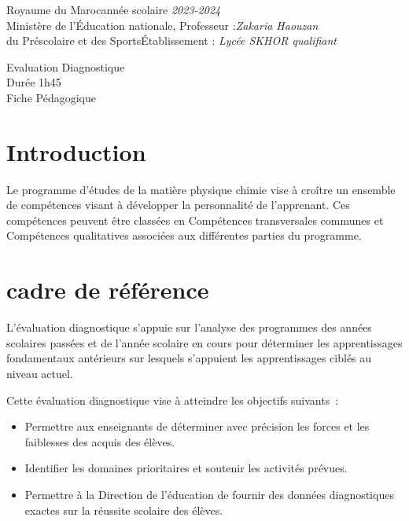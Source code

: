 \documentclass[12pt]{article}
\newcommand\headerMe[2]{\noindent{}#1\hfill#2}
\begin{document}
\headerMe{Royaume du Maroc}{année scolaire \emph{2023-2024}}\\
\headerMe{Ministère de l'Éducation nationale, }{  Professeur :\emph{Zakaria Haouzan}}\\
\headerMe{du Préscolaire et des Sports}{Établissement : \emph{Lycée SKHOR qualifiant}}\\

\begin{center}
Evaluation Diagnostique \\
Durée 1h45
\\
    \vspace{.2cm}
\hrulefill
\Large{Fiche Pédagogique}
\hrulefill\\
\end{center}


\section[A]{Introduction }
\hspace{0.5cm}Le programme d'études de la matière physique chimie vise à croître un ensemble de compétences visant à développer la personnalité de l'apprenant. Ces compétences peuvent être classées en Compétences transversales communes et Compétences qualitatives associées aux différentes parties du programme.
\section{cadre de référence }
 \hspace{0.5cm}
L'évaluation diagnostique s'appuie sur l'analyse des programmes des années scolaires passées et de l'année scolaire en cours pour déterminer les apprentissages fondamentaux antérieurs sur lesquels s'appuient les apprentissages ciblés au niveau actuel.

Cette évaluation diagnostique vise à atteindre les objectifs suivants :
\begin{itemize}
	\item Permettre aux enseignants de déterminer avec précision les forces et les faiblesses des acquis des élèves.
	\item Identifier les domaines prioritaires et soutenir les activités prévues.
	\item Permettre à la Direction de l'éducation de fournir des données diagnostiques exactes sur la réussite scolaire des élèves.
\end{itemize}
\end{document}
